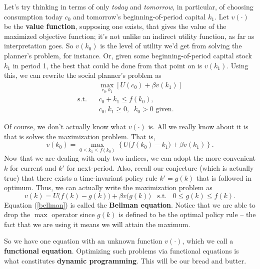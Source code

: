\documentclass[12pt]{article}
\theoremstyle{definition}
\begin{document}
Let's try thinking in terms of only \emph{today} and \emph{tomorrow}, in particular, of choosing consumption today $c_0$ and tomorrow's beginning-of-period capital $k_1$. Let $v(\cdot)$ be the \textbf{value function}, supposing one exists, that gives the value of the maximized objective function; it's not unlike an indirect utility function, as far as interpretation goes. So $v(k_0)$ is the level of utility we'd get from solving the planner's problem, for instance. Or, given some beginning-of-period capital stock $k_1$ in period 1, the best that could be done from that point on is $v(k_1)$. Using this, we can rewrite the social planner's problem as 
\begin{align*}
	&\max_{c_0, k_1} \left[U(c_0) + \beta v(k_1) \right]\\
	\text{s.t. }\;\; &c_0 + k_1 \leq f(k_0),\\
	&c_0, k_1 \geq 0, \;\; k_0>0 \text{ given}.
\end{align*}

Of course, we don't actually know what $v(\cdot)$ is. All we really know about it is that is solves the maximization problem. That is,
	\[v(k_0) = \max_{0 \leq k_1 \leq f(k_0)} \left \{ U\big( f(k_0) - k_1 \big) + \beta v(k_1) \right \}.	\]
Now that we are dealing with only two indices, we can adopt the more convenient $k$ for current and $k'$ for next-period. Also, recall our conjecture (which is actually true) that there exists a time-invariant policy rule $k'=g(k)$ that is followed in optimum. Thus, we can actually write the maximization problem as 
\begin{equation}
	v(k) = U\big( f(k) - g(k) \big) + \beta v\big( g(k) \big)  \; \; \text{ s.t. } \;\; 0 \leq g(k) \leq f(k) . \label{bellman}
\end{equation}
Equation (\ref{bellman}) is called the \textbf{Bellman equation}. Notice that we are able to drop the $\max$ operator since $g(k)$ is defined to be the optimal policy rule -- the fact that we are using it means we will attain the maximum.

So we have one equation with an unknown function $v(\cdot)$, which we call a \textbf{functional equation}. Optimizing such problems via functional equations is what constitutes \textbf{dynamic programming}. This will be our bread and butter. 
\end{document}
